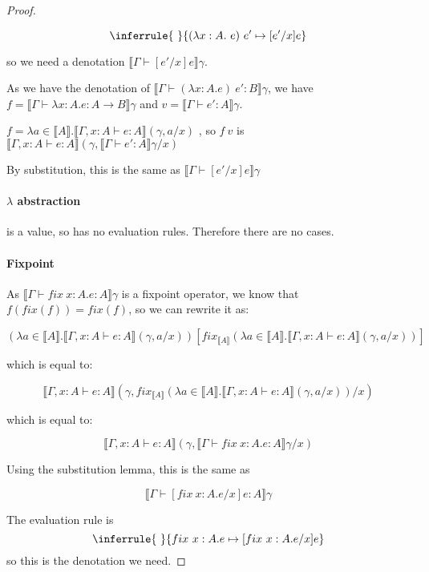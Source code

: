 \begin{proof}
\begin{enumerate}
{$$
\inferrule{ \ }
 {(\lambda x: A .\ e) \ e' \mapsto [e'/x]e}
$$

so we need a denotation $\llbracket \Gamma \vdash [e'/x]e \rrbracket \gamma$.

As we have the denotation of $\llbracket \Gamma \vdash (\lambda x:A. e) \ e' : B \rrbracket \gamma$, we have $f = \llbracket \Gamma \vdash \lambda x:A. e : A \to B \rrbracket \gamma$ and $v = \llbracket \Gamma \vdash e': A  \rrbracket \gamma.$

$f = \lambda a \in \llbracket A \rrbracket . \llbracket \Gamma, x : A \vdash e : A \rrbracket(\gamma, a/x)$ , so $f \ v$ is $\llbracket \Gamma, x : A \vdash e : A \rrbracket(\gamma, \llbracket \Gamma \vdash e' : A \rrbracket \gamma /x)$

By substitution, this is the same as $\llbracket \Gamma \vdash [e'/x]e \rrbracket \gamma$}
\end{enumerate}

\paragraph{$\lambda$ abstraction}  is a value, so has no evaluation rules. Therefore there are no cases.

\paragraph{Fixpoint} As $\llbracket \Gamma \vdash fix \ x:A .e : A \rrbracket \gamma$ is a fixpoint operator, we know that $f(fix(f)) = fix(f)$, so we can rewrite it as:

\[(\lambda a \in \llbracket A \rrbracket . \llbracket \Gamma, x : A \vdash e : A \rrbracket(\gamma, a/x))[fix_{\llbracket A \rrbracket} (\lambda a \in \llbracket A \rrbracket . \llbracket \Gamma, x : A \vdash e : A \rrbracket(\gamma, a/x))]\]

which is equal to:

\[\llbracket \Gamma, x : A \vdash e : A \rrbracket(\gamma, fix_{\llbracket A \rrbracket} (\lambda a \in \llbracket A \rrbracket . \llbracket \Gamma, x : A \vdash e : A \rrbracket(\gamma, a/x)) /x)
\]

which is equal to:

\[\llbracket \Gamma, x : A \vdash e : A \rrbracket(\gamma, \llbracket \Gamma \vdash fix \ x:A .e : A \rrbracket \gamma/x)
\]

Using the substitution lemma, this is the same as

\[\llbracket \Gamma \vdash [fix \ x:A.e/x] e : A \rrbracket \gamma \]
 
 
The evaluation rule is 
$$
\inferrule{ \ }
{fix \ x:A. e \mapsto [fix \ x:A. e/x]e}
$$
so this is the denotation we need.
\end{proof}